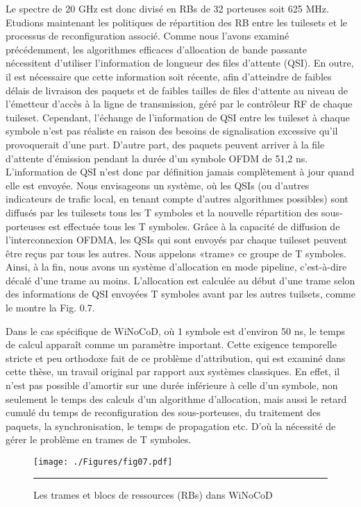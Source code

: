 Le spectre de 20 GHz est donc divisé en RBs de 32 porteuses soit 625 MHz. Etudions maintenant les politiques de répartition des RB entre les tuilesets et le processus de reconfiguration associé. Comme nous l'avons examiné précédemment, les algorithmes efficaces d'allocation de bande passante nécessitent d'utiliser l'information de longueur des files d'attente (QSI). En outre, il est nécessaire que cette information soit récente, afin d'atteindre de faibles délais de livraison des paquets et de faibles tailles de files d‘attente au niveau de l’émetteur d’accès à la ligne de transmission, géré par le contrôleur RF de chaque tuileset. Cependant, l’échange de l’information de QSI entre les tuileset à chaque symbole n’est pas réaliste en raison des besoins de signalisation excessive qu’il provoquerait d’une part. D’autre part, des paquets peuvent arriver à la file d’attente d’émission pendant la durée d’un symbole OFDM de 51,2 ns. L’information de QSI n’est donc par définition jamais complètement à jour quand elle est envoyée. Nous envisageons un système, où les QSIs (ou d'autres indicateurs de trafic local, en tenant compte d'autres algorithmes possibles) sont diffusés par les tuilesets tous les T symboles et la nouvelle répartition des sous-porteuses est effectuée tous les T symboles. Grâce à la capacité de diffusion de l'interconnexion OFDMA, les QSIs qui sont envoyés par chaque tuileset peuvent être reçus par tous les autres. Nous appelons «trame» ce groupe de T symboles. Ainsi, à la fin, nous avons un système d'allocation en mode pipeline, c’est-à-dire décalé d’une trame au moins. L'allocation est calculée au début d'une trame selon des informations de QSI envoyées T symboles avant par les autres tuilsets, comme le montre la Fig. 0.7.

Dans le cas spécifique de WiNoCoD, où 1 symbole est d’environ 50 ns, le temps de calcul apparaît comme un paramètre important. Cette exigence temporelle stricte et peu orthodoxe fait de ce problème d'attribution, qui est examiné dans cette thèse, un travail original par rapport aux systèmes classiques. En effet, il n’est pas possible d'amortir sur une durée inférieure à celle d’un symbole, non seulement le temps des calculs d’un algorithme d’allocation, mais aussi le retard cumulé du temps de reconfiguration des sous-porteuses, du traitement des paquets, la synchronisation, le temps de propagation etc. D’où la nécessité de gérer le problème en trames de T symboles.


\begin{figure}[htbp]
  \centering
    \texttt{[image: ./Figures/fig07.pdf]}
    \rule{35em}{0.5pt}
  \caption[Les trames et blocs de ressources (RBs) dans WiNoCoD]{Les trames et blocs de ressources (RBs) dans WiNoCoD}
  \label{fig:Electron}
\end{figure}

